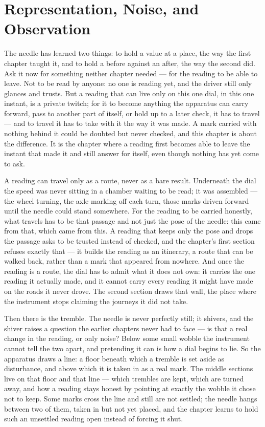 \chapter{Representation, Noise, and Observation}

The needle has learned two things: to hold a value at a place, the way the first chapter taught it, and to hold a before against an after, the way the second did. Ask it now for something neither chapter needed --- for the reading to be able to leave. Not to be read by anyone: no one is reading yet, and the driver still only glances and trusts. But a reading that can live only on this one dial, in this one instant, is a private twitch; for it to become anything the apparatus can carry forward, pass to another part of itself, or hold up to a later check, it has to travel --- and to travel it has to take with it the way it was made. A mark carried with nothing behind it could be doubted but never checked, and this chapter is about the difference. It is the chapter where a reading first becomes able to leave the instant that made it and still answer for itself, even though nothing has yet come to ask.

A reading can travel only as a route, never as a bare result. Underneath the dial the speed was never sitting in a chamber waiting to be read; it was assembled --- the wheel turning, the axle marking off each turn, those marks driven forward until the needle could stand somewhere. For the reading to be carried honestly, what travels has to be that passage and not just the pose of the needle: this came from that, which came from this. A reading that keeps only the pose and drops the passage asks to be trusted instead of checked, and the chapter's first section refuses exactly that --- it builds the reading as an itinerary, a route that can be walked back, rather than a mark that appeared from nowhere. And once the reading is a route, the dial has to admit what it does not own: it carries the one reading it actually made, and it cannot carry every reading it might have made on the roads it never drove. The second section draws that wall, the place where the instrument stops claiming the journeys it did not take.

Then there is the tremble. The needle is never perfectly still; it shivers, and the shiver raises a question the earlier chapters never had to face --- is that a real change in the reading, or only noise? Below some small wobble the instrument cannot tell the two apart, and pretending it can is how a dial begins to lie. So the apparatus draws a line: a floor beneath which a tremble is set aside as disturbance, and above which it is taken in as a real mark. The middle sections live on that floor and that line --- which trembles are kept, which are turned away, and how a reading stays honest by pointing at exactly the wobble it chose not to keep. Some marks cross the line and still are not settled; the needle hangs between two of them, taken in but not yet placed, and the chapter learns to hold such an unsettled reading open instead of forcing it shut.

